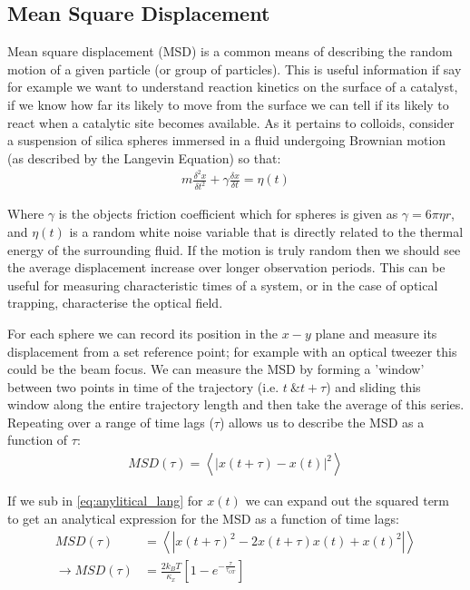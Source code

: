 \subsection{Mean Square Displacement}
Mean square displacement (MSD) is a common means of describing 
the random motion of a given particle (or group of particles). 
This is useful information if say for example we want to understand 
reaction kinetics on the surface of a catalyst, if we know how 
far its likely to move from the surface we can tell if its likely 
to react when a catalytic site becomes available. As it pertains 
to colloids, consider a suspension of silica spheres immersed in 
a fluid undergoing Brownian motion (as described by the Langevin 
Equation) so that:
\begin{align}
	m\frac{\delta^2 x}{\delta t^2}+ 
	\gamma\frac{\delta x}{\delta t} = \eta(t)
\end{align}

Where $\gamma$ is the objects friction coefficient which for spheres 
is given as $\gamma = 6\pi\eta r$, and $\eta(t)$ is a random white 
noise variable that is directly related to the thermal energy of 
the surrounding fluid. If the motion is truly random then we should 
see the average displacement increase over longer observation periods. 
This can be useful for measuring characteristic times of a system, or
in the case of optical trapping, characterise the optical field. 

For each sphere we can record its position in the $x-y$ plane and 
measure its displacement from a set reference point; for example 
with an optical tweezer this could be the beam focus. We can measure 
the MSD by forming a 'window' between two points in time of the 
trajectory (i.e. $t\ \&  t+\tau$) and sliding this window along the 
entire trajectory length and then take the average of this series. Repeating over a range of time lags ($\tau$) allows us to describe 
the MSD as a function of $\tau$:
\begin{align}
	MSD(\tau) = \left<|x(t+\tau) - x(t)|^2\right>
\end{align}

If we sub in \eqref{eq:anylitical_lang} for $x(t)$ we can expand 
out the squared term to get an analytical expression for the MSD 
as a function of time lags:
\begin{align}
	\label{eq:MSD}
	MSD(\tau) &= \left<|x(t+\tau)^2-2x(t+\tau)x(t)+x(t)^2|\right> \\
	\rightarrow MSD(\tau) &=\frac{2k_BT}{\kappa_x}\left[1-e^{-\frac{\tau}{\tau_{OT}}}\right]
\end{align}

